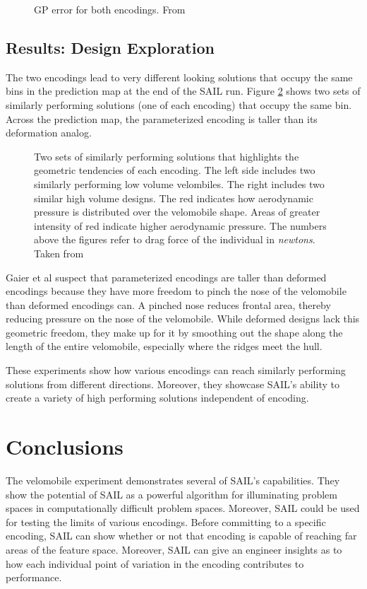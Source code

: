 \documentclass{sig-alternate}
\begin{document}
\begin{figure}[htb]
\centering
{}
\caption{GP error for both encodings. From \cite{Gaier:2018}}
\label{fig:ModelAccuracy}
\end{figure}

\subsection{Results: Design Exploration}
The two encodings lead to very different looking solutions that occupy the same bins in the prediction map at the end of the SAIL run.
Figure \ref{fig:3DShapes} shows two sets of similarly performing solutions (one of each encoding) that occupy the same bin.
Across the prediction map, the parameterized encoding is taller than its deformation analog.

\begin{figure}[htb]
\centering
{}
\caption{Two sets of similarly performing solutions that highlights the geometric tendencies of each encoding.
The left side includes two similarly performing low volume velombiles.
The right includes two similar high volume designs.
The red indicates how aerodynamic pressure is distributed over the velomobile shape.
Areas of greater intensity of red indicate higher aerodynamic pressure.
The numbers above the figures refer to drag force of the individual in \textit{newtons}.
Taken from \cite{Gaier:2018}}
\label{fig:3DShapes}
\end{figure}

Gaier et al suspect that parameterized encodings are taller than deformed encodings because they have more freedom to pinch the nose of the velomobile than deformed encodings can.
A pinched nose reduces frontal area, thereby reducing pressure on the nose of the velomobile.
While deformed designs lack this geometric freedom, they make up for it by smoothing out the shape along the length of the entire velomobile, especially where the ridges meet the hull.

These experiments show how various encodings can reach similarly performing solutions from different directions.
Moreover, they showcase SAIL's ability to create a variety of high performing solutions independent of encoding.

\section{Conclusions}
\label{sec:conclusions}
The velomobile experiment demonstrates several of SAIL's capabilities.
They show the potential of SAIL as a powerful algorithm for illuminating problem spaces in computationally difficult problem spaces.
Moreover, SAIL could be used for testing the limits of various encodings.
Before committing to a specific encoding, SAIL can show whether or not that encoding is capable of reaching far areas of the feature space.
Moreover, SAIL can give an engineer insights as to how each individual point of variation in the encoding contributes to performance. 
\end{document}
